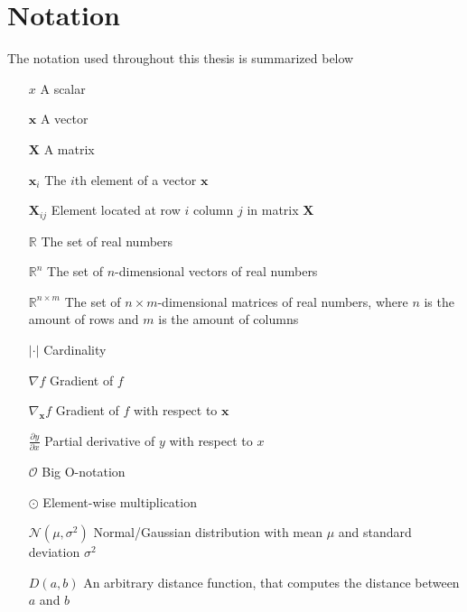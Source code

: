 \documentclass[./main.tex]{subfiles}
\begin{document}
\section*{Notation}
The notation used throughout this thesis is summarized below

\begin{itemize}[leftmargin=2.0cm,labelsep=0.5cm]
    \item[$x$] A scalar
    \item[$\bm{x}$] A vector
    \item[$\bm{X}$] A matrix
    \item[$\bm{x}_i$] The $i$th element of a vector $\bm{x}$ 
    \item[$\bm{X}_{ij}$] Element located at row $i$ column $j$ in matrix $\bm{X}$
    \item[$\mathbb{R}$] The set of real numbers
    \item[$\mathbb{R}^n$] The set of $n$-dimensional vectors of real numbers
    \item[$\mathbb{R}^{n \times m}$] The set of $n \times m$-dimensional matrices of real numbers, where $n$ is the amount of rows and $m$ is the amount of columns
    \item[$|\cdot|$] Cardinality
    \item[$\nabla f$] Gradient of $f$
    \item[$\nabla_{\bm{x}} f$] Gradient of $f$ with respect to $\bm{x}$ 
    \item[$\frac{\partial y}{\partial x}$] Partial derivative of $y$ with respect to $x$
    \item[$\mathcal{O}$] Big O-notation
    \item[$\odot$] Element-wise multiplication
    \item[$\mathcal{N} \left(\mu, \sigma^2 \right)$] Normal/Gaussian distribution with mean $\mu$ and standard deviation $\sigma^2$
    \item[$D(a, b)$] An arbitrary distance function, that computes the distance between $a$ and $b$
\end{itemize}
\end{document}
